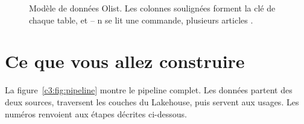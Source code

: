 \begin{figure}[H]
{}
\caption{Modèle de données Olist. Les colonnes soulignées forment la clé de chaque table, et
 -- n \fg{} se lit \og une commande, plusieurs articles \fg{}.}
\label{c3:fig:modele}
\end{figure}

\section{Ce que vous allez construire}

La figure~\ref{c3:fig:pipeline} montre le pipeline complet. Les données partent des deux sources,
traversent les couches du Lakehouse, puis servent aux usages. Les numéros renvoient aux étapes
décrites ci-dessous.

